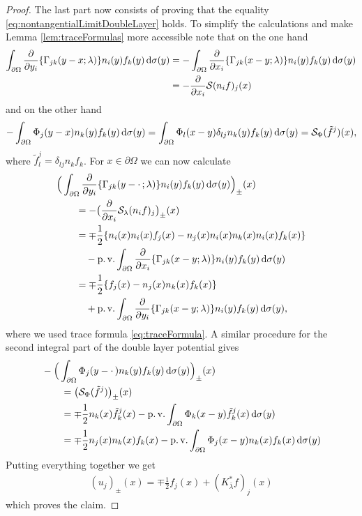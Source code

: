 \begin{proof}
  The last part now consists of proving that the equality \eqref{eq:nontangentialLimitDoubleLayer} holds.
  To simplify the calculations and make Lemma \ref{lem:traceFormulas} more accessible note that on the one hand
  \begin{align*}
    \int_{\partial\Omega} \frac{\partial}{\partial y_i} \{ \Gamma_{jk}(y - x; \lambda) \} n_i(y) f_k(y) \, {\operatorname{d}\!{\sigma}}(y)
    &= -\int_{\partial\Omega} \frac{\partial}{\partial x_i} \{ \Gamma_{jk}(x - y; \lambda) \} n_i(y) f_k(y) \, {\operatorname{d}\!{\sigma}}(y)\\
    &= -\frac{\partial}{\partial x_i} \mathcal{S}(n_i f)_j(x)
  \end{align*}
  and on the other hand
  \begin{align*}
    -\int_{\partial\Omega} \Phi_j(y - x) n_k(y) f_k(y) \, {\operatorname{d}\!{\sigma}}(y)
    = \int_{\partial\Omega} \Phi_l(x - y) \delta_{lj} n_k(y) f_k(y) \, {\operatorname{d}\!{\sigma}}(y)
    = \mathcal{S}_\Phi(\tilde f^j)(x), 
  \end{align*}
  where $\tilde f^j_l = \delta_{lj} n_k f_k$.
  For $x \in \partial\Omega$ we can now calculate
  \begin{align*}
    &\Big( \int_{\partial\Omega} \frac{\partial}{\partial y_i} \{ \Gamma_{jk}(y - \cdot\, ; \lambda) \} n_i(y) f_k(y) \, {\operatorname{d}\!{\sigma}}(y) \Big)_\pm(x)\\
    &\qquad= - \big( \frac{\partial}{\partial x_i} \mathcal{S}_\lambda(n_i f)_j\big)_\pm(x) \\
    &\qquad= \mp \frac{1}{2} \{ n_i(x) n_i(x) f_j(x) - n_j(x) n_i(x) n_k(x) n_i(x) f_k(x)  \} \\
    &\qquad\quad - \operatorname{p. v.}\int_{\partial\Omega} \frac{\partial}{\partial x_i} \{\Gamma_{jk}(x - y; \lambda) \} n_i(y) f_k(y) \, {\operatorname{d}\!{\sigma}}(y) \\
    &\qquad= \mp \frac{1}{2} \{ f_j(x) - n_j(x) n_k(x) f_k(x) \} \\
    &\qquad\quad + \operatorname{p. v.}\int_{\partial\Omega} \frac{\partial}{\partial y_i} \{\Gamma_{jk}(x - y; \lambda) \} n_i(y) f_k(y) \, {\operatorname{d}\!{\sigma}}(y),
  \end{align*}
  where we used trace formula \eqref{eq:traceFormula}.
  A similar procedure for the second integral part of the double layer potential gives
  \begin{align*}
    &-\Big(\int_{\partial\Omega} \Phi_j(y - \cdot\,) n_k(y) f_k(y) \, {\operatorname{d}\!{\sigma}}(y)\Big)_\pm(x) \\
    &\qquad= \big(\mathcal{S}_\Phi(\tilde f^j)\big)_\pm(x)  \\
    &\qquad= \mp \frac{1}{2} n_k(x) \tilde f^j_k(x) - \operatorname{p. v.} \int_{\partial\Omega} \Phi_k(x - y) \tilde f^j_k(x) \, {\operatorname{d}\!{\sigma}}(y) \\
    &\qquad= \mp \frac{1}{2} n_j(x) n_k(x) f_k(x) - \operatorname{p. v.} \int_{\partial\Omega} \Phi_j(x - y) n_k(x) f_k(x) \, {\operatorname{d}\!{\sigma}}(y)
  \end{align*}
  Putting everything together we get
  \begin{align*}
    (u_j)_\pm(x) = \mp\frac{1}{2} f_j(x) + (K_{\bar\lambda}^* f)_j(x)
  \end{align*}
  which proves the claim.
\end{proof}
